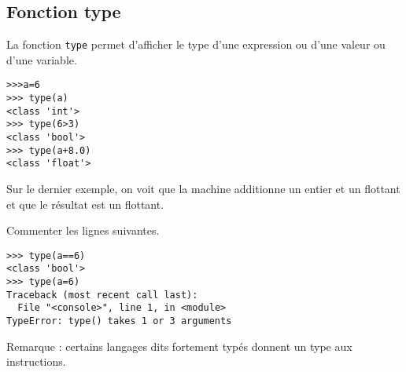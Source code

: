 \subsection{Fonction type}
La fonction \lstinline?type? permet d'afficher le type d'une expression ou d'une valeur ou d'une variable.
\begin{lstlisting}
>>>a=6
>>> type(a)
<class 'int'>
>>> type(6>3)
<class 'bool'>
>>> type(a+8.0)
<class 'float'>
\end{lstlisting}
Sur le dernier exemple, on voit que la machine additionne un entier et un flottant et que le résultat est un flottant.\par
Commenter les lignes suivantes.
\begin{lstlisting}
>>> type(a==6)
<class 'bool'>
>>> type(a=6)
Traceback (most recent call last):
  File "<console>", line 1, in <module>
TypeError: type() takes 1 or 3 arguments
\end{lstlisting}
Remarque : certains langages dits fortement typés donnent un type aux instructions.
